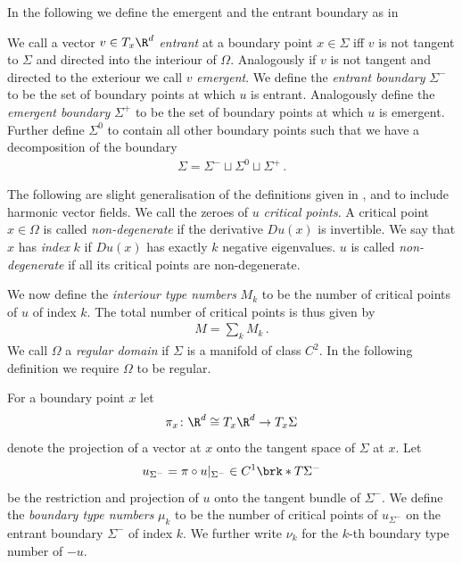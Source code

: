 In the following we define the emergent and the entrant boundary as in \cite[p.282]{Morse1970}
\begin{definition}
  We call a vector $v\in T_x\R^d$ \emph{entrant} at a boundary point $x\in\Sigma$ iff $v$ is not tangent to $\Sigma$
  and directed into the interiour of $\Omega$. Analogously if $v$ is not tangent and
  directed to the exteriour we call $v$ \emph{emergent}.
  We define the \emph{entrant boundary} $\Sigma^-$ to be the set of boundary points at which $u$ is entrant.
  Analogously define the \emph{emergent boundary} $\Sigma^+$ to be the set of boundary points at which
  $u$ is emergent.
  Further define $\Sigma^0$ to contain all other boundary points such that we have a decomposition
  of the boundary
  \begin{align*}
    \Sigma=\Sigma^-\sqcup\Sigma^0\sqcup\Sigma^+\,.
  \end{align*}
\end{definition}

The following are slight generalisation of the definitions given in \cite[p.138f]{Shelton1980}, \cite[§5]{Morse1969} and \cite[p.282f]{Morse1970}
to include harmonic vector fields.
We call the zeroes of $u$ \emph{critical points}. A critical point $x\in\Omega$ is called
\emph{non-degenerate} if the derivative $Du(x)$ is invertible. We say that $x$ has \emph{index} $k$
if $Du(x)$ has exactly $k$ negative eigenvalues. $u$ is called \emph{non-degenerate} if all its critical points
are non-degenerate.

We now define the \emph{interiour type numbers} $M_k$
to be the number of critical points of $u$ of index $k$.
The total number of critical points is thus given by
\begin{align*}
  M=\sum_kM_k\,.
\end{align*}
We call $\Omega$ a \emph{regular domain} if $\Sigma$ is a manifold of class $C^2$.
In the following definition we require $\Omega$ to be regular.
\begin{definition}
  For a boundary point $x$ let $$\pi_x\colon \R^d\cong T_x\R^d\to T_x\Sigma$$ denote the projection of a
  vector at $x$ onto the tangent space of $\Sigma$ at $x$.
  Let $$u_{\Sigma^-}=\pi\circ u\vert_{\Sigma^-}\in C^1\brk*{T\Sigma^-}$$ be the restriction and projection of $u$ onto the tangent bundle of $\Sigma^-$.
  We define the \emph{boundary type numbers} $\mu_k$ to be
  the number of critical points of $u_{\Sigma^-}$ on the entrant boundary
  $\Sigma^-$ of index $k$.
  We further write $\nu_k$ for the $k$-th boundary type number of $-u$.
\end{definition}

